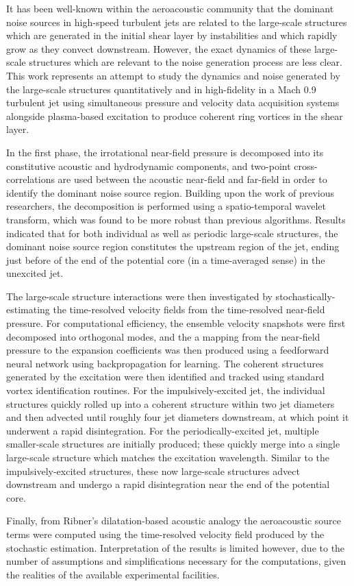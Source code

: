 It has been well-known within the aeroacoustic community that the dominant noise sources in high-speed turbulent jets are related to the large-scale structures which are generated in the initial shear layer by instabilities and which rapidly grow as they convect downstream.
However, the exact dynamics of these large-scale structures which are relevant to the noise generation process are less clear.
This work represents an attempt to study the dynamics and noise generated by the large-scale structures quantitatively and in high-fidelity in a Mach 0.9 turbulent jet using simultaneous pressure and velocity data acquisition systems alongside plasma-based excitation to produce coherent ring vortices in the shear layer.

In the first phase, the irrotational near-field pressure is decomposed into its constitutive acoustic and hydrodynamic components, and two-point cross-correlations are used between the acoustic near-field and far-field in order to identify the dominant noise source region.
Building upon the work of previous researchers, the decomposition is performed using a spatio-temporal wavelet transform, which was found to be more robust than previous algorithms.
Results indicated that for both individual as well as periodic large-scale structures, the dominant noise source region constitutes the upstream region of the jet, ending just before of the end of the potential core (in a time-averaged sense) in the unexcited jet.

The large-scale structure interactions were then investigated by stochastically-estimating the time-resolved velocity fields from the time-resolved near-field pressure.
For computational efficiency, the ensemble velocity snapshots were first decomposed into orthogonal modes, and the a mapping from the near-field pressure to the expansion coefficients was then produced using a feedforward neural network using backpropagation for learning.
The coherent structures generated by the excitation were then identified and tracked using standard vortex identification routines.
For the impulsively-excited jet, the individual structures quickly rolled up into a coherent structure within two jet diameters and then advected until roughly four jet diameters downstream, at which point it underwent a rapid disintegration.
For the periodically-excited jet, multiple smaller-scale structures are initially produced; these quickly merge into a single large-scale structure which matches the excitation wavelength.
Similar to the impulsively-excited structures, these now large-scale structures advect downstream and undergo a rapid disintegration near the end of the potential core. 

Finally, from Ribner's dilatation-based acoustic analogy the aeroacoustic source terms were computed using the time-resolved velocity field produced by the stochastic estimation.
Interpretation of the results is limited however, due to the number of assumptions and simplifications necessary for the computations, given the realities of the available experimental facilities.


